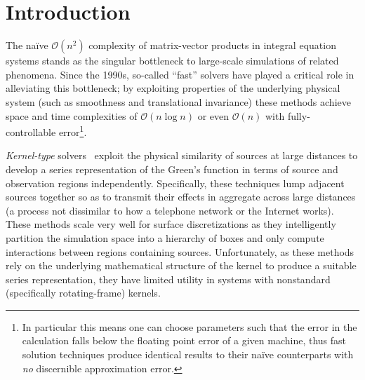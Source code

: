 \section{Introduction}

The na\"ive $\mathcal{O}(n^2)$ complexity of matrix-vector products in integral equation systems stands as the singular bottleneck to large-scale simulations of related phenomena.
Since the 1990s, so-called ``fast'' solvers have played a critical role in alleviating this bottleneck; by exploiting properties of the underlying physical system (such as smoothness and translational invariance) these methods achieve space and time complexities of $\mathcal{O}(n \log n)$ or even $\mathcal{O}(n)$ with fully-controllable error\footnote{In particular this means one can choose parameters such that the error in the calculation falls below the floating point error of a given machine, thus fast solution techniques produce identical results to their na\"ive counterparts with \emph{no} discernible approximation error.}.

\emph{Kernel-type} solvers~\cite{Greengard1987,PWTD} exploit the physical similarity of sources at large distances to develop a series representation of the Green's function in terms of source and observation regions independently.
Specifically, these techniques lump adjacent sources together so as to transmit their effects in aggregate across large distances (a process not dissimilar to how a telephone network or the Internet works).
These methods scale very well for surface discretizations as they intelligently partition the simulation space into a hierarchy of boxes and only compute interactions between regions containing sources.
Unfortunately, as these methods rely on the underlying mathematical structure of the kernel to produce a suitable series representation, they have limited utility in systems with nonstandard (specifically rotating-frame) kernels.

